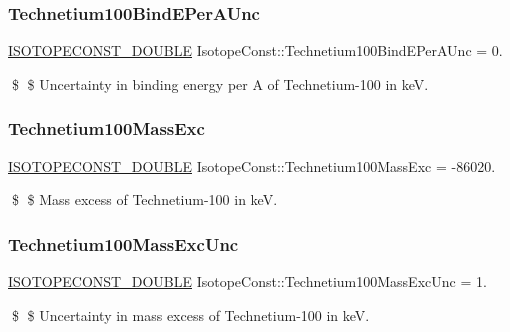 \subsubsection{\texorpdfstring{Technetium100\+Bind\+E\+Per\+A\+Unc}{Technetium100BindEPerAUnc}}
{\footnotesize\ttfamily \mbox{\hyperlink{group___isotope_const-_macros_ga8f45a7272ce02c0b4c65c44636ed719a}{I\+S\+O\+T\+O\+P\+E\+C\+O\+N\+S\+T\+\_\+\+D\+O\+U\+B\+LE}} Isotope\+Const\+::\+Technetium100\+Bind\+E\+Per\+A\+Unc = 0.}

\$ \$ Uncertainty in binding energy per A of Technetium-\/100 in keV. \mbox{\label{group___isotope_const-_technetium-_tc100_ga9f01347046266da6ebb430eb3ce60e81}} 
\subsubsection{\texorpdfstring{Technetium100\+Mass\+Exc}{Technetium100MassExc}}
{\footnotesize\ttfamily \mbox{\hyperlink{group___isotope_const-_macros_ga8f45a7272ce02c0b4c65c44636ed719a}{I\+S\+O\+T\+O\+P\+E\+C\+O\+N\+S\+T\+\_\+\+D\+O\+U\+B\+LE}} Isotope\+Const\+::\+Technetium100\+Mass\+Exc = -\/86020.}

\$ \$ Mass excess of Technetium-\/100 in keV. \mbox{\label{group___isotope_const-_technetium-_tc100_ga118465c790bdd4d01e857c05360dca16}} 
\subsubsection{\texorpdfstring{Technetium100\+Mass\+Exc\+Unc}{Technetium100MassExcUnc}}
{\footnotesize\ttfamily \mbox{\hyperlink{group___isotope_const-_macros_ga8f45a7272ce02c0b4c65c44636ed719a}{I\+S\+O\+T\+O\+P\+E\+C\+O\+N\+S\+T\+\_\+\+D\+O\+U\+B\+LE}} Isotope\+Const\+::\+Technetium100\+Mass\+Exc\+Unc = 1.}

\$ \$ Uncertainty in mass excess of Technetium-\/100 in keV. \mbox{\label{group___isotope_const-_technetium-_tc100_gabe08029ddd5a73db168704fa4f5535e4}} 
